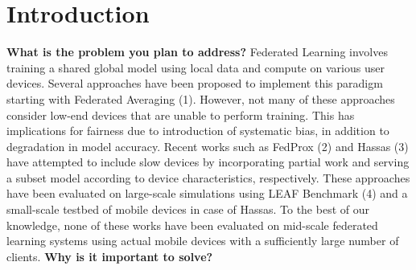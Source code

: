 \section{Introduction}
    \textbf{What is the problem you plan to address?}
    \newline
    \newline
    Federated Learning involves training a shared global model using local data and compute on various user devices.
    Several approaches have been proposed to implement this paradigm starting with Federated Averaging (1).
    However, not many of these approaches consider low-end devices that are unable to perform training. 
    This has implications for fairness due to introduction of systematic bias, in addition to degradation in model accuracy.
    Recent works such as FedProx (2) and Hassas (3) have attempted to include slow devices by incorporating partial work and serving a subset model according to device characteristics, respectively. 
    These approaches have been evaluated on large-scale simulations using LEAF Benchmark (4) and a small-scale testbed of mobile devices in case of Hassas.
    To the best of our knowledge, none of these works have been evaluated on mid-scale federated learning systems using actual mobile devices with a sufficiently large number of clients.
    \newline
    \newline
    \textbf{Why is it important to solve?}